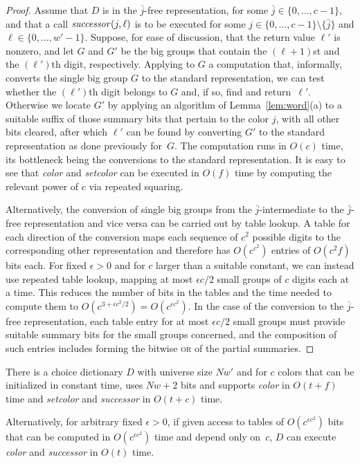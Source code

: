 \documentclass[envcountsame,envcountsect,undated,nolinenumbers]{lnthi}
\def\Tvn#1{\hbox{\textit{#1\/}}}
\def\jj{{\bar j}}
\begin{document}
\begin{proof}
Assume that $D$ is in the $\jj$-free representation, for
some $\jj\in\{0,\ldots,c-1\}$, and that a
call $\Tvn{successor}(j,\ell)$ is to be
executed for some
$j\in\{0,\ldots,c-1\}\setminus\{\jj\}$
and $\ell\in\{0,\ldots,w'-1\}$.
Suppose, for ease of discussion, that the return value
$\ell'$ is nonzero, and let $G$ and $G'$ be the big
groups that contain the $(\ell+1)$st and the $(\ell')$th
digit, respectively.
Applying to $G$ a computation that, informally,
converts the single big group $G$ to the standard
representation, we can test whether
the $(\ell')$th digit belongs to $G$ and,
if so, find and return~$\ell'$.
Otherwise we locate $G'$ by applying an algorithm
of Lemma~\ref{lem:word}(a) to a suitable suffix of
those summary bits that pertain
to the color $j$, with all other bits cleared,
after which $\ell'$ can be found by converting
$G'$ to the standard representation
as done previously for~$G$.
The computation runs in $O(c)$ time, its
bottleneck being the conversions to the
standard representation.
It is easy to see that \Tvn{color} and \Tvn{setcolor}
can be executed in $O(f)$ time by computing
the relevant power of $c$ via repeated squaring.

Alternatively, the conversion of single big groups
from the $\jj$-intermediate
to the $\jj$-free representation
and vice versa can be carried out
by table lookup.
A table for each direction
of the conversion maps each sequence of
$c^2$ possible digits
to the corresponding other
representation and therefore has $O(c^{c^2})$ entries
of $O(c^2 f)$ bits each.
For fixed $\epsilon>0$ and
for $c$ larger than a suitable constant,
we can instead
use repeated table lookup,
mapping at most ${{\epsilon c}/2}$ small groups of
$c$ digits each at a time.
This reduces the number of bits in the tables
and the time needed to compute them to
$O(c^{3+{{\epsilon c^2}/2}})=O(c^{\epsilon c^2})$.
In the case of the conversion to the
$\jj$-free representation, each table entry
for at most ${{\epsilon c}/2}$ small groups
must provide suitable summary bits for the
small groups concerned, and the composition 
of such entries includes forming the bitwise
\textsc{or} of the partial summaries.
\end{proof}

\begin{lemma}
\label{lem:smalltree}There is a choice dictionary $D$ with
universe size $N w'$ and for $c$ colors
that can be initialized in constant time,
uses $N w+2$ bits and
supports \Tvn{color} in $O(t+f)$ time and
\Tvn{setcolor} 
and \Tvn{successor}
in $O(t+c)$ time.

Alternatively, for arbitrary fixed $\epsilon>0$,
if given access to tables of
$O(c^{\epsilon c^2})$ bits that can be computed in
$O(c^{\epsilon c^2})$ time and depend
only on~$c$, $D$ can execute
\Tvn{color} and \Tvn{successor}
in $O(t)$ time.
\end{lemma}
\end{document}
